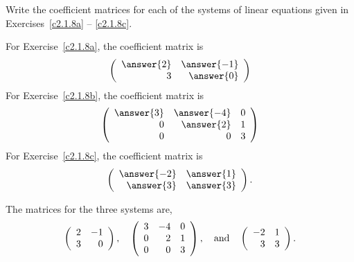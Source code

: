 \documentclass{ximera}
\begin{document}
\begin{exercise} \label{c2.1.8A}
Write the coefficient matrices for each of the systems of linear equations 
given in Exercises~\ref{c2.1.8a} -- \ref{c2.1.8c}.
\begin{prompt}
  For Exercise~\ref{c2.1.8a}, the coefficient matrix is
  \[
    \mattwo{\answer{2}}{\answer{-1}}{3}{\answer{0}}
  \]
  For Exercise~\ref{c2.1.8b}, the coefficient matrix is
  \[
    \matthree{\answer{3}}{\answer{-4}}{0}{0}{\answer{2}}{1}{0}{0}{3}
  \]
  For Exercise~\ref{c2.1.8c}, the coefficient matrix is
  \[
    \mattwo{\answer{-2}}{\answer{1}}{\answer{3}}{\answer{3}}.
  \]
\end{prompt}


\begin{solution}
The matrices for the three systems are,
\[
\left(\begin{array}{rr} 2 & -1\\ 3 &0\end{array}\right), \quad
\left(\begin{array}{rrr} 3 & -4 & 0 \\ 0 & 2 & 1 \\ 0 & 0 & 3\end{array}\right), \quad\mbox{and}\quad
\left(\begin{array}{rr} -2 & 1\\ 3 &3\end{array}\right).
\]

\end{solution}
\end{exercise}
\end{document}
